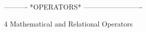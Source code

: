  
 
 
 
 
 
 
 
 
 
 
 
 
 
 
 
 
 
 
 
 
 
 
 
 
 
 
 
 
 
 
 
 
 
 
 
 
 
 
 
 
 
 
 
 
 
 
 
 
 
 
 
 
----------  *OPERATORS*  -------------------------
 
4
Mathematical and Relational Operators
 
 
 
 
 
 
 
 
 
 
 
 
 
 
 
 
 
 
 
 
 
 
 
 
 
 
 
 
 
 
 
 
 
 
 
 
 
 
 
 
 
 
 
 
 
 
 
 
 
 
 
 
 
 
 
 
 
 
 
 
 
